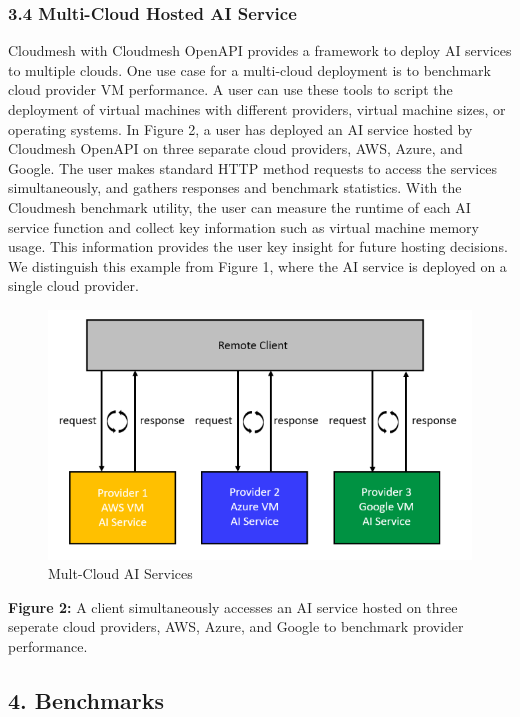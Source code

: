 \hypertarget{multi-cloud-hosted-ai-service}{%
\subsubsection{3.4 Multi-Cloud Hosted AI
Service}\label{multi-cloud-hosted-ai-service}}

Cloudmesh with Cloudmesh OpenAPI provides a framework to deploy AI
services to multiple clouds. One use case for a multi-cloud deployment
is to benchmark cloud provider VM performance. A user can use these
tools to script the deployment of virtual machines with different
providers, virtual machine sizes, or operating systems. In Figure 2, a
user has deployed an AI service hosted by Cloudmesh OpenAPI on three
separate cloud providers, AWS, Azure, and Google. The user makes
standard HTTP method requests to access the services simultaneously, and
gathers responses and benchmark statistics. With the Cloudmesh benchmark
utility, the user can measure the runtime of each AI service function
and collect key information such as virtual machine memory usage. This
information provides the user key insight for future hosting decisions.
We distinguish this example from Figure 1, where the AI service is
deployed on a single cloud provider.

\begin{figure}
\centering
\includegraphics{../images/multi-cloud-ai-service.png}
\caption{Mult-Cloud AI Services}
\end{figure}

\textbf{Figure 2:} A client simultaneously accesses an AI service hosted
on three seperate cloud providers, AWS, Azure, and Google to benchmark
provider performance.

\hypertarget{benchmarks}{%
\subsection{4. Benchmarks}\label{benchmarks}}

